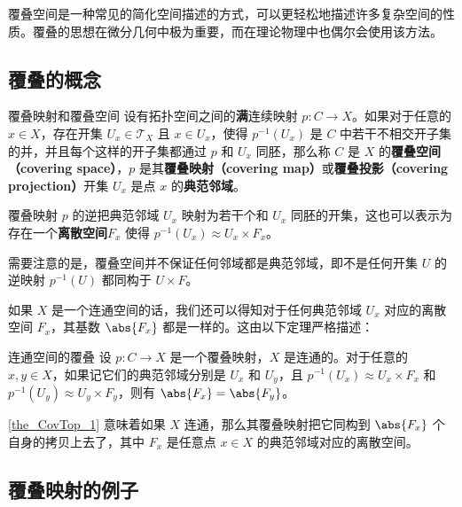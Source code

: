 

覆叠空间是一种常见的简化空间描述的方式，可以更轻松地描述许多复杂空间的性质。覆叠的思想在微分几何中极为重要，而在理论物理中也偶尔会使用该方法。

\subsection{覆叠的概念}
\begin{definition}{覆叠映射和覆叠空间}\label{def_CovTop_1}
设有拓扑空间之间的\textbf{满}连续映射 $p:C\rightarrow X$。如果对于任意的 $x\in X$，存在开集 $U_x\in\mathcal{T}_X$ 且 $x\in U_x$，使得 $p^{-1}(U_x)$ 是 $C$ 中若干不相交开子集的并，并且每个这样的开子集都通过 $p$ 和 $U_x$ 同胚，那么称 $C$ 是 $X$ 的\textbf{覆叠空间（covering space）}，$p$ 是其\textbf{覆叠映射（covering map）}或\textbf{覆叠投影（covering projection）}开集 $U_x$ 是点 $x$ 的\textbf{典范邻域}。
\end{definition} 

覆叠映射 $p$ 的逆把典范邻域 $U_x$ 映射为若干个和 $U_x$ 同胚的开集，这也可以表示为存在一个\textbf{离散空间}$F_x$ 使得 $p^{-1}(U_x)\approx U_x\times F_x$。

需要注意的是，覆叠空间并不保证任何邻域都是典范邻域，即不是任何开集 $U$ 的逆映射 $p^{-1}(U)$ 都同构于 $U\times F$。

如果 $X$ 是一个连通空间的话，我们还可以得知对于任何典范邻域 $U_x$ 对应的离散空间 $F_x$，其基数 $\abs{F_x}$ 都是一样的。这由以下定理严格描述：

\begin{theorem}{连通空间的覆叠}\label{the_CovTop_1}
设 $p:C\rightarrow X$ 是一个覆叠映射，$X$ 是连通的。对于任意的 $x, y\in X$，如果记它们的典范邻域分别是 $U_x$ 和 $U_y$，且 $p^{-1}(U_x)\approx U_x\times F_x$ 和 $p^{-1}(U_y)\approx U_y\times F_y$，则有 $\abs{F_x}=\abs{F_y}$。
\end{theorem}

\autoref{the_CovTop_1} 意味着如果 $X$ 连通，那么其覆叠映射把它同构到 $\abs{F_x}$ 个自身的拷贝上去了，其中 $F_x$ 是任意点 $x\in X$ 的典范邻域对应的离散空间。

\subsection{覆叠映射的例子}

